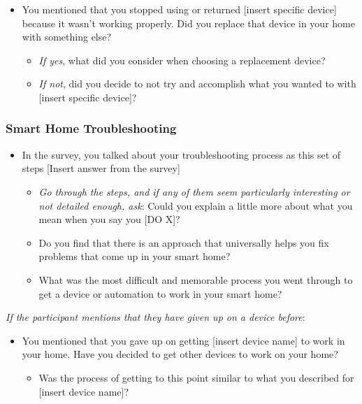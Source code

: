 \begin{itemize}
    \item You mentioned that you stopped using or returned [insert specific device] because it wasn't working properly. Did you replace that device in your home with something else? 
    \begin{itemize}
        \item \textit{If yes}, what did you consider when choosing a replacement device?
        \item \textit{If not}, did you decide to not try and accomplish what you wanted to with [insert specific device]?
    \end{itemize}
\end{itemize}

\subsubsection{Smart Home Troubleshooting}
\begin{itemize}
    \item In the survey, you talked about your troubleshooting process as this set of steps [Insert answer from the survey]
    \begin{itemize}
        \item \textit{Go through the steps, and if any of them seem particularly interesting or not detailed enough, ask}: Could you explain a little more about what you mean when you say you [DO X]?
        \item Do you find that there is an approach that universally helps you fix problems that come up in your smart home?
        \item What was the most difficult and memorable process you went through to get a device or automation to work in your smart home?
    \end{itemize}
\end{itemize}
\textit{If the participant mentions that they have given up on a device before}:
\begin{itemize}
    \item You mentioned that you gave up on getting [insert device name] to work in your home. Have you decided to get other devices to work on your home? 
    \begin{itemize}
        \item Was the process of getting to this point similar to what you described for [insert device name]?
    \end{itemize}
\end{itemize}

